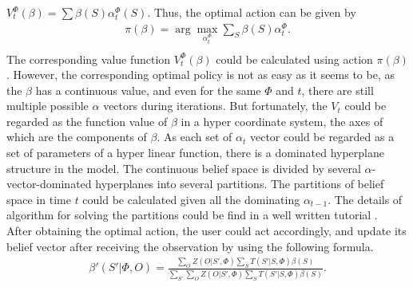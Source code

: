 \documentclass[journal,12pt,draftclsnofoot,onecolumn]{IEEEtran}
\begin{document}
\(V_t^\Phi\left(\beta\right) = \sum\beta\left(S\right)\alpha_t^\Phi\left(S\right)\).
Thus, the optimal action can be given by
\begin{equation}
\begin{aligned}
	\pi\left(\beta\right) =
	\arg\underset{\alpha_t^\Phi}{\max}\sum\limits_{S}\beta\left(S\right)\alpha_t^\Phi.\\
\end{aligned}
\end{equation}
The corresponding value function \(V_t^\Phi\left(\beta\right)\) could be calculated using action \(\pi\left(\beta\right)\).
However, the corresponding optimal policy is not as easy as it seems to be, as the \(\beta\) has a continuous value,
and even for the same \(\Phi\) and \(t\), there are still multiple possible \(\alpha\) vectors during iterations.
But fortunately, the \(V_t\) could be regarded as the function value of \(\beta\) in a hyper coordinate system,
the axes of which are the components of \(\beta\).
As each set of \(\alpha_t\) vector could be regarded as a set of parameters of a hyper linear function,
there is a dominated hyperplane structure in the model.
The continuous belief space is divided by several \(\alpha\)-vector-dominated hyperplanes into several partitions.
The partitions of belief space in time \(t\) could be calculated given all the dominating \(\alpha_{t-1}\).
The details of algorithm for solving the partitions could be find in a well written tutorial \cite{pomdptool}.\\
\indent
After obtaining the optimal action, the user could act accordingly,
and update its belief vector after receiving the observation by using the following formula.
\begin{align}
	\beta'\left(S'|\Phi, O\right) = \frac{\sum_{O}Z\left(O|S',\Phi\right)\sum_{S}
	T\left(S'|S,\Phi\right)\beta\left(S\right)}
	{\sum_{S'}\sum_{O}Z\left(O|S',\Phi\right)\sum_{S}T\left(S'|S,\Phi\right)\beta\left(S\right)}.
\end{align}
\end{document}
